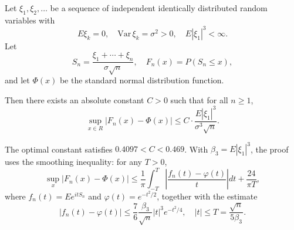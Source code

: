 Let $\xi_1, \xi_2, \ldots$ be a sequence of independent identically distributed random variables with
$$E\xi_k = 0, \quad \text{Var}\,\xi_k = \sigma^2 > 0, \quad E|\xi_1|^3 < \infty.$$
Let
$$S_n = \frac{\xi_1 + \cdots + \xi_n}{\sigma\sqrt{n}}, \quad F_n(x) = P(S_n \leq x),$$
and let $\Phi(x)$ be the standard normal distribution function.

Then there exists an absolute constant $C > 0$ such that for all $n \geq 1$,
$$\sup_{x \in R} |F_n(x) - \Phi(x)| \leq C \cdot \frac{E|\xi_1|^3}{\sigma^3 \sqrt{n}}.$$

The optimal constant satisfies $0.4097 < C < 0.469$. With $\beta_3 = E|\xi_1|^3$, the proof uses the smoothing inequality: for any $T > 0$,
$$\sup_x |F_n(x) - \Phi(x)| \leq \frac{1}{\pi} \int_{-T}^{T} \left|\frac{f_n(t) - \varphi(t)}{t}\right| dt + \frac{24}{\pi T},$$
where $f_n(t) = E e^{itS_n}$ and $\varphi(t) = e^{-t^2/2}$, together with the estimate
$$|f_n(t) - \varphi(t)| \leq \frac{7}{6} \frac{\beta_3}{\sqrt{n}} |t|^3 e^{-t^2/4}, \quad |t| \leq T = \frac{\sqrt{n}}{5\beta_3}.$$
